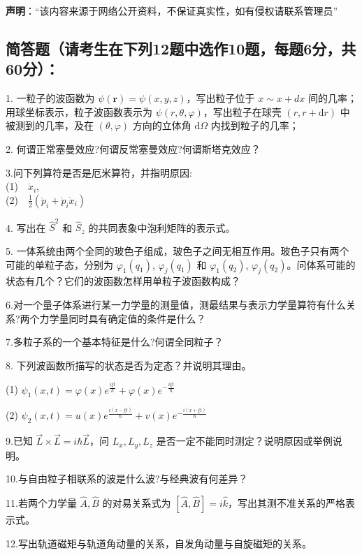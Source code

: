
\textbf{声明}：“该内容来源于网络公开资料，不保证真实性，如有侵权请联系管理员”

\subsection{简答题（请考生在下列12题中选作10题，每题6分，共60分）：}

1. 一粒子的波函数为 $\psi (\mathbf{r}) = \psi (x, y, z)$，写出粒子位于 $x \sim x + d x$ 间的几率；用球坐标表示，粒子波函数表示为 $\psi (r, \theta, \varphi)$，写出粒子在球壳 $(r, r + \mathrm{d}r)$ 中被测到的几率，及在 $(\theta, \varphi)$ 方向的立体角 $\mathrm{d}\Omega$ 内找到粒子的几率；

2. 何谓正常塞曼效应?何谓反常塞曼效应?何谓斯塔克效应？

3.问下列算符是否是厄米算符，并指明原因:\\
(1)$\quad \ddot{x}_i,$\\ (2)$\quad \frac{1}{2}(\ddot{p}_i + \dot{p}_i \dot{x}_i)$

4. 写出在 $\hat{S}^2$ 和 $\hat{S}_z$ 的共同表象中泡利矩阵的表示式。

5. 一体系统由两个全同的玻色子组成，玻色子之间无相互作用。玻色子只有两个可能的单粒子态，分别为 $\varphi_1(q_1)$, $\varphi_j(q_1)$ 和 $\varphi_1(q_2)$, $\varphi_j(q_2)$。问体系可能的状态有几个？它们的波函数怎样用单粒子波函数构成？

6.对一个量子体系进行某一力学量的测量值，测最结果与表示力学量算符有什么关系?两个力学量同时具有确定值的条件是什么？

7.多粒子系的一个基本特征是什么?何谓全同粒子？

8. 下列波函数所描写的状态是否为定态？并说明其理由。

 (1) $\psi_1(x,t) = \varphi(x) e^{\frac{i \xi t}{\hbar}} + \varphi(x) e^{-\frac{i \xi t}{\hbar}}$

 (2) $\psi_2(x,t) = u(x) e^{\frac{i (x - \xi t)}{\hbar}} + v(x) e^{-\frac{i (x + \xi t)}{\hbar}}$

9.已知 $\vec{L} \times \vec{L} = i\hbar \vec{L}$，问 $L_x, L_y, L_z$ 是否一定不能同时测定？说明原因或举例说明。

10.与自由粒子相联系的波是什么波?与经典波有何差异？

11.若两个力学量 $\hat{A}, \hat{B}$ 的对易关系式为 $[\hat{A}, \hat{B}] = i\hat k$，写出其测不准关系的严格表示式。

12.写出轨道磁矩与轨道角动量的关系，自发角动量与自旋磁矩的关系。

